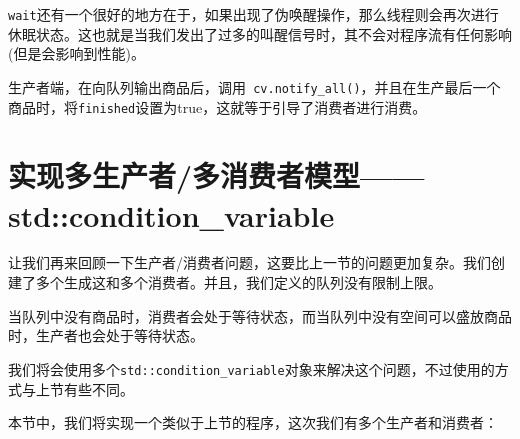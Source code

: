 \texttt{wait}还有一个很好的地方在于，如果出现了伪唤醒操作，那么线程则会再次进行休眠状态。这也就是当我们发出了过多的叫醒信号时，其不会对程序流有任何影响(但是会影响到性能)。

生产者端，在向队列输出商品后，调用\texttt{ cv.notify\_all()}，并且在生产最后一个商品时，将\texttt{finished}设置为true，这就等于引导了消费者进行消费。


\section{实现多生产者/多消费者模型——std::condition\_variable}

让我们再来回顾一下生产者/消费者问题，这要比上一节的问题更加复杂。我们创建了多个生成这和多个消费者。并且，我们定义的队列没有限制上限。

当队列中没有商品时，消费者会处于等待状态，而当队列中没有空间可以盛放商品时，生产者也会处于等待状态。

我们将会使用多个\texttt{std::condition\_variable}对象来解决这个问题，不过使用的方式与上节有些不同。


本节中，我们将实现一个类似于上节的程序，这次我们有多个生产者和消费者：

